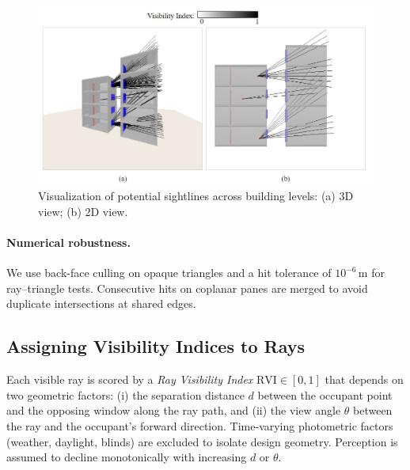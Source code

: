 \documentclass[final,3p,times,review]{elsarticle}
\begin{document}
\begin{figure}[H]
    \centering
    \includegraphics[width=1\textwidth]{ray-intersections.jpg}
    \caption{Visualization of potential sightlines across building levels: (a) 3D view; (b) 2D view.}
    \label{fig:ray-intersections}
\end{figure}

\paragraph{Numerical robustness.}
We use back-face culling on opaque triangles and a hit tolerance of $10^{-6}$\,m for ray–triangle tests. Consecutive hits on coplanar panes are merged to avoid duplicate intersections at shared edges.

\subsection{Assigning Visibility Indices to Rays}
\label{sec:rvi}
Each visible ray is scored by a \emph{Ray Visibility Index} $\mathrm{RVI}\in[0,1]$ that depends on two geometric factors: (i) the separation distance $d$ between the occupant point and the opposing window along the ray path, and (ii) the view angle $\theta$ between the ray and the occupant’s forward direction. Time-varying photometric factors (weather, daylight, blinds) are excluded to isolate design geometry. Perception is assumed to decline monotonically with increasing $d$ or $\theta$.
\end{document}
